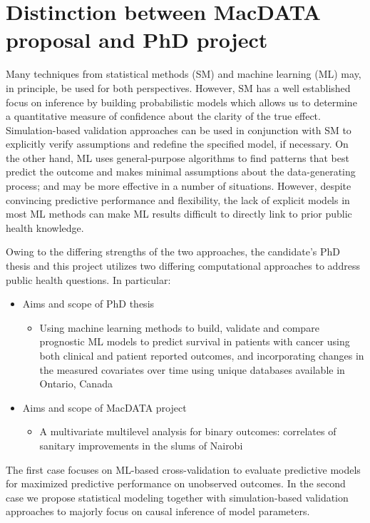 \documentclass[12pt]{article}
\begin{document}
\section*{Distinction between MacDATA proposal and PhD project}

Many techniques from statistical methods (SM) and machine learning (ML) may, in principle, be used for both perspectives. However, SM has a well established focus on inference by building probabilistic models which allows us to determine a quantitative measure of confidence about the clarity of the true effect. Simulation-based validation approaches can be used in conjunction with SM to explicitly verify assumptions and redefine the specified model, if necessary. On the other hand, ML uses general-purpose algorithms to find patterns that best predict the outcome and makes minimal assumptions about the data-generating process; and may be more effective in a number of situations. However, despite convincing predictive performance and flexibility, the lack of explicit models in most ML methods can make ML results difficult to directly link to prior public health knowledge.

Owing to the differing strengths of the two approaches, the candidate's PhD thesis and this project utilizes two differing computational approaches to address public health questions. In particular:

\begin{itemize}
\item Aims and scope of PhD thesis
\begin{itemize}
\item Using machine learning methods to build, validate and compare prognostic ML models to predict survival in patients with cancer using both clinical and patient reported outcomes, and incorporating changes in the measured covariates over time using unique databases available in Ontario, Canada
\end{itemize}
\item Aims and scope of MacDATA project
\begin{itemize}
\item A multivariate multilevel analysis for binary outcomes: correlates of sanitary improvements in the slums of Nairobi
\end{itemize}
\end{itemize}
The first case focuses on ML-based cross-validation to evaluate predictive models for maximized predictive performance on unobserved outcomes. In the second case we propose statistical modeling together with simulation-based validation approaches to majorly focus on causal inference of model parameters.
\end{document}
